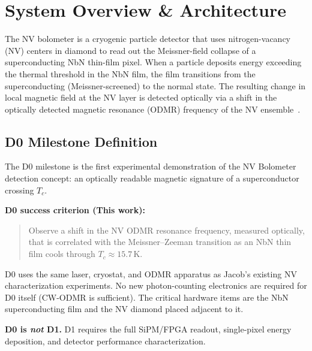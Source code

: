 
\section{System Overview \& Architecture}
\label{sec:overview}

The NV bolometer is a cryogenic particle detector that uses nitrogen-vacancy (NV) centers in
diamond to read out the Meissner-field collapse of a superconducting NbN thin-film pixel.
When a particle deposits energy exceeding the thermal threshold in the NbN film, the film
transitions from the superconducting (Meissner-screened) to the normal state. The resulting
change in local magnetic field at the NV layer is detected optically via a shift in the
optically detected magnetic resonance (ODMR) frequency of the NV
ensemble~\cite{Doherty2013}.

\subsection{D0 Milestone Definition}
\label{sec:d0_milestone}

The D0 milestone is the first experimental demonstration of the NV Bolometer detection
concept: an optically readable magnetic signature of a superconductor crossing $T_c$.

\textbf{D0 success criterion (This work):}
\begin{quote}
Observe a shift in the NV ODMR resonance frequency, measured optically, that is correlated
with the Meissner--Zeeman transition as an NbN thin film cools through
$T_c \approx 15.7$\,K.
\end{quote}

D0 uses the same laser, cryostat, and ODMR apparatus as Jacob's existing NV characterization
experiments. No new photon-counting electronics are required for D0 itself (CW-ODMR is
sufficient). The critical hardware items are the NbN superconducting film and the NV diamond
placed adjacent to it.

\textbf{D0 is \emph{not} D1.} D1 requires the full SiPM/FPGA readout, single-pixel energy
deposition, and detector performance characterization.

